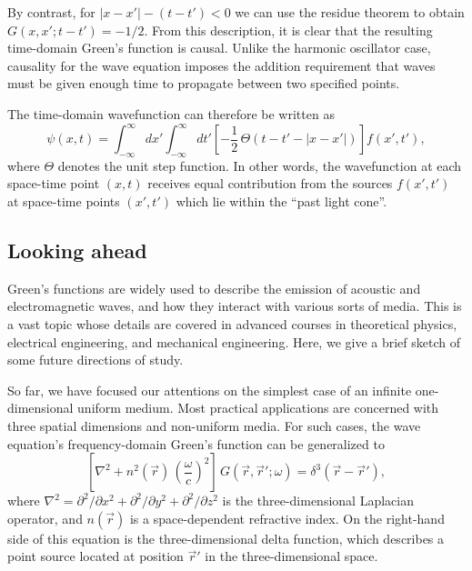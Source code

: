 \documentclass[10pt,a4paper]{article}
\begin{document}
By contrast, for $|x-x'| - (t-t') < 0$ we can use the residue theorem
to obtain $G(x,x';t-t') = -1/2$. From this description, it is clear
that the resulting time-domain Green's function is causal. Unlike the
harmonic oscillator case, causality for the wave equation imposes the
addition requirement that waves must be given enough time to propagate
between two specified points.

The time-domain wavefunction can therefore be written as
\begin{equation}
\psi(x,t) = \int_{-\infty}^\infty dx' \int_{-\infty}^\infty dt' \left[-\frac{1}{2}\,\Theta(t-t' - |x-x'|)\right] f(x',t'),
\end{equation}
where $\Theta$ denotes the unit step function. In other words, the
wavefunction at each space-time point $(x,t)$ receives equal
contribution from the sources $f(x',t')$ at space-time points
$(x',t')$ which lie within the ``past light cone''.

\subsection{Looking ahead}\label{looking-ahead}

Green's functions are widely used to describe the emission of acoustic
and electromagnetic waves, and how they interact with various sorts of
media. This is a vast topic whose details are covered in advanced
courses in theoretical physics, electrical engineering, and mechanical
engineering. Here, we give a brief sketch of some future directions of
study.

So far, we have focused our attentions on the simplest case of an
infinite one-dimensional uniform medium. Most practical applications
are concerned with three spatial dimensions and non-uniform media. For
such cases, the wave equation's frequency-domain Green's function can
be generalized to
\begin{equation}
\left[\nabla^2 + n^2(\vec{r}) \, \left(\frac{\omega}{c}\right)^2\right]\, G(\vec{r},\vec{r}';\omega) = \delta^3(\vec{r}-\vec{r}'),
\end{equation}
where $\nabla^2 = \partial^2/\partial x^2 + \partial^2/\partial y^2 +
\partial^2/\partial z^2$ is the three-dimensional Laplacian operator,
and $n(\vec{r})$ is a space-dependent refractive index. On the
right-hand side of this equation is the three-dimensional delta
function, which describes a point source located at position
$\vec{r}'$ in the three-dimensional space.
\end{document}
